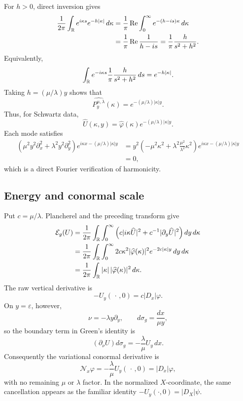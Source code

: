 For $h>0$, direct inversion gives
\begin{align*}
 \frac1{2\pi}\int_{\mathbb{R}}e^{i\kappa s}e^{-h|\kappa|}\,d\kappa
 &=\frac1\pi\operatorname{Re}
   \int_0^\infty e^{-(h-is)\kappa}\,d\kappa\\
 &=\frac1\pi\operatorname{Re}\frac1{h-is}
  =\frac1\pi\frac{h}{s^2+h^2}.
\end{align*}
Equivalently,
\begin{equation}\label{eq:appendix-cauchy-fourier-pair}
 \int_{\mathbb{R}}e^{-i\kappa s}\frac1\pi\frac{h}{s^2+h^2}\,ds
 =e^{-h|\kappa|}.
\end{equation}
Taking $h=(\mu/\lambda)y$ shows that
\[
 \widehat{P^{\mu,\lambda}_y}(\kappa)
 =e^{-(\mu/\lambda)|\kappa|y}.
\]
Thus, for Schwartz data,
\[
 \widehat U(\kappa,y)
 =\widehat\varphi(\kappa)e^{-(\mu/\lambda)|\kappa|y}.
\]
Each mode satisfies
\begin{align*}
 \left(\mu^2y^2\partial_x^2
       +\lambda^2y^2\partial_y^2\right)
 e^{i\kappa x-(\mu/\lambda)|\kappa|y}
 &=y^2\left(-\mu^2\kappa^2
       +\lambda^2\frac{\mu^2}{\lambda^2}\kappa^2\right)
   e^{i\kappa x-(\mu/\lambda)|\kappa|y}\\
 &=0,
\end{align*}
which is a direct Fourier verification of harmonicity.

\subsection{Energy and conormal scale}

Put $c=\mu/\lambda$.  Plancherel and the preceding transform give
\begin{align*}
 \mathcal E_g(U)
 &=\frac1{2\pi}\int_{\mathbb{R}}\int_0^\infty
 \left(c|i\kappa\widehat U|^2
      +c^{-1}|\partial_y\widehat U|^2\right)dy\,d\kappa\\
 &=\frac1{2\pi}\int_{\mathbb{R}}\int_0^\infty
 2c\kappa^2|\widehat\varphi(\kappa)|^2
 e^{-2c|\kappa|y}\,dy\,d\kappa\\
 &=\frac1{2\pi}\int_{\mathbb{R}}
 |\kappa|\,|\widehat\varphi(\kappa)|^2\,d\kappa.
\end{align*}
The raw vertical derivative is
\[
 -U_y(\,\cdot\,,0)=c|D_x|\varphi.
\]
On $y=\varepsilon$, however,
\[
 \nu=-\lambda y\partial_y,
 \qquad
 d\sigma_g=\frac{dx}{\mu y},
\]
so the boundary term in Green's identity is
\[
 (\partial_\nu U)d\sigma_g
 =-\frac\lambda\mu U_y\,dx.
\]
Consequently the variational conormal derivative is
\[
 \mathcal N_x\varphi
 =-\frac\lambda\mu U_y(\,\cdot\,,0)
 =|D_x|\varphi,
\]
with no remaining $\mu$ or $\lambda$ factor.  In the normalized $X$-coordinate,
the same cancellation appears as the familiar identity
$-U_y(\cdot,0)=|D_X|\psi$.

